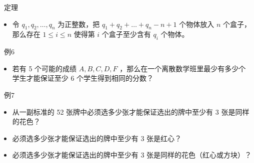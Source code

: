 \documentclass[UTF8]{report}
\theoremstyle{MyLineTheoremStyle} %
\theoremstyle{MyBlockTheoremStyle} %
\theoremstyle{MySubsubsectionStyle} %
\begin{document}
\textbullet\ 定理
\begin{itemize}
    \item 令 $q_1, q_2, \ldots , q_n$ 为正整数，把 $q_1 + q_2 + \ldots + q_n - n + 1$ 个物体放入 $n$ 个盒子，那么存在 $1 \leq i \leq n$ 使得第 $i$ 个盒子至少含有 $q_i$ 个物体。
\end{itemize}

\textbullet\ 例6
\begin{itemize}
    \item 若有 5 个可能的成绩 $A, B, C, D, F$ ，那么在一个离散数学班里最少有多少个学生才能保证至少 6 个学生得到相同的分数？
\end{itemize}

\textbullet\ 例7
\begin{itemize}
    \item 从一副标准的 52 张牌中必须选多少张才能保证选出的牌中至少有 3 张是同样的花色？
    \item 必须选多少张才能保证选出的牌中至少有 3 张是红心？
    \item 必须选多少张才能保证选出的牌中至少有 3 张是同样的花色（红心或方块）？
\end{itemize}
\end{document}
